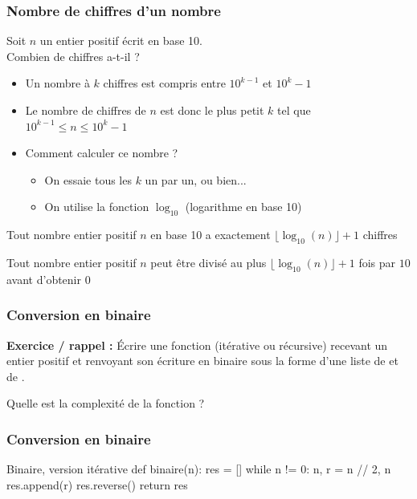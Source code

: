 \documentclass[12pt]{linfo-beamer}
\begin{document}
\begin{frame}
  \frametitle{Nombre de chiffres d'un nombre}

  Soit $n$ un entier positif écrit en base 10.\\
  Combien de chiffres a-t-il ?
  \begin{itemize}
  \item Un nombre à $k$ chiffres est compris entre $10^{k-1}$ et ${10^k}-1$
  \item Le nombre de chiffres de $n$ est donc le plus petit $k$ tel que $10^{k-1} \leq n \leq {10^k}-1$
  \item Comment calculer ce nombre ? \pause
  \begin{itemize}
    \item On essaie tous les $k$ un par un, ou bien... \pause
    \item On utilise la fonction $\log_{10}$ (logarithme en base 10)
  \end{itemize}
  \end{itemize}

  \vfill

  \begin{beamerboxesrounded}{}
   Tout nombre entier positif $n$ en base 10 a
  exactement $\lfloor \log_{10}(n) \rfloor + 1$ chiffres
  \end{beamerboxesrounded}

  \pause
  \vfill

  \begin{beamerboxesrounded}{}
   Tout nombre entier positif $n$ peut être
  divisé au plus $\lfloor \log_{10}(n) \rfloor + 1$ fois par $10$ avant
  d'obtenir $0$
  \end{beamerboxesrounded}

\end{frame}


\begin{frame}
  \frametitle{Conversion en binaire}

  \textbf{Exercice / rappel :} Écrire une fonction (itérative ou récursive)
   recevant un entier positif  et renvoyant son
  écriture en binaire sous la forme d'une liste de  et de
  .

  Quelle est la complexité de la fonction ?
\end{frame}


\begin{frame}[fragile]
  \frametitle{Conversion en binaire}

  \begin{pyframe}{Binaire, version itérative}
    def binaire(n):
        res = []
        while n != 0:
            n, r = n // 2, n %
            res.append(r)
        res.reverse()
        return res
  \end{pyframe}
\end{frame}
\end{document}
